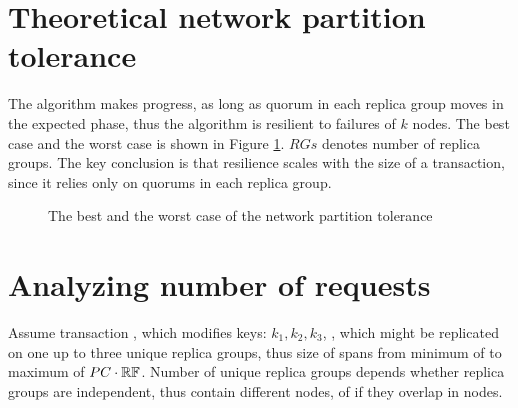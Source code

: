 \section{Theoretical network partition tolerance}
The algorithm makes progress, as long as quorum in each replica group moves in the expected phase, thus the algorithm is resilient to failures of $k$ nodes. The best case and the worst case is shown in Figure \ref{fig:tests:networkPartitionTolerance}. $RGs$ denotes number of replica groups. The key conclusion is that resilience scales with the size of a transaction, since it relies only on quorums in each replica group.

\begin{figure}[hbt]
  \setlength{\unitlength}{1.3cm}  
  \caption{The best and the worst case of the network partition tolerance}
  \label{fig:tests:networkPartitionTolerance}
\end{figure}

\section{Analyzing number of requests}
Assume transaction \transaction, which modifies keys: $k_{1}, k_{2}, k_{3}$,
, which might be replicated on one up to three unique replica groups, thus size of \nodesTx spans from minimum of \RFalone to maximum of $PC\cdot\mathbb{RF}$. Number of unique replica groups depends whether replica groups are independent, thus contain different nodes, of if they overlap in nodes.

